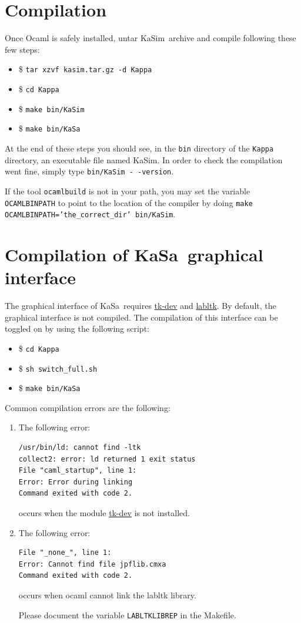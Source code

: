 \documentclass[11pt]{book}
\def\KaSim{\textsf{KaSim}}
\def\KaSa{\textsf{KaSa}}
\def\ttt#1{\texttt{#1}}
\def\ITE#1{\begin{itemize}#1\end{itemize}}
\begin{document}
\section{Compilation}
Once Ocaml is safely installed, untar \KaSim~archive and compile following these
few steps: \ITE{
\item[\$]\ttt{tar xzvf kasim.tar.gz -d Kappa}
\item[\$]\ttt{cd Kappa}
\item[\$]\ttt{make bin/KaSim} 
\item[\$]\ttt{make bin/KaSa}} At the end of these steps you should see, in the
\ttt{bin} directory of the \ttt{Kappa} directory, an executable file named
KaSim.  In order to check the compilation went fine, simply type
\ttt{bin/KaSim -\,-version}.

If the tool \ttt{ocamlbuild} is not in your path, you may
set the variable \ttt{OCAMLBINPATH} to point to the location of the
compiler by doing \ttt{make OCAMLBINPATH='the\_correct\_dir' bin/KaSim}.

\section{Compilation of KaSa~graphical interface}

The graphical interface of \KaSa~requires \href{http://www.tcl.tk/}{tk-dev} and 
\href{https://forge.ocamlcore.org/projects/labltk/}{labltk}. By default, the graphical interface is not compiled. The compilation of this interface can be toggled on by using the following script: \ITE{
\item[\$]\ttt{cd Kappa}
\item[\$]\ttt{sh switch\_full.sh}
\item[\$]\ttt{make bin/KaSa}}

Common compilation errors are the following:
\begin{enumerate}
\item The following error: 

\begin{verbatim}
/usr/bin/ld: cannot find -ltk
collect2: error: ld returned 1 exit status
File "caml_startup", line 1:
Error: Error during linking
Command exited with code 2.
\end{verbatim}

occurs when the module  \href{http://www.tcl.tk/}{tk-dev} is not installed. 
\item The following error:

\begin{verbatim}
File "_none_", line 1:
Error: Cannot find file jpflib.cmxa
Command exited with code 2.
\end{verbatim}

occurs when ocaml cannot link the labltk library. 

Please document the variable \texttt{LABLTKLIBREP} in the Makefile. 

\end{enumerate}
\end{document}
